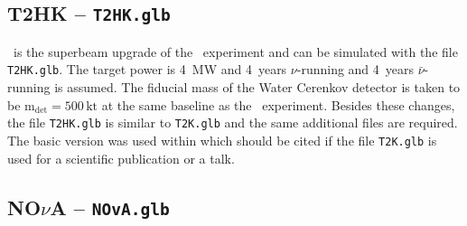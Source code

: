 \begin{appendix}
\subsection*{T2HK -- {\tt T2HK.glb}}

\TtoHK\ is the superbeam upgrade of the \TtoK\ experiment and can be simulated with the file {\tt T2HK.glb}. 
The target power is 4~MW and 
4~years $\nu$-running and 4~years $\bar{\nu}$-running is assumed.
The fiducial mass of the Water Cerenkov detector is taken to be $\mathrm{m_{det} = 500 \,kt}$ at the same
baseline as the \TtoK\ experiment. Besides these changes, the file {\tt T2HK.glb} is similar to {\tt T2K.glb}
and the same additional files are required. 
The basic version was used within \cite{Huber:2002mx} which should be cited if the file {\tt T2K.glb} is 
used for a scientific publication or a talk. 

\subsection*{NO$\nu$A -- {\tt NOvA.glb}}


\end{appendix}
